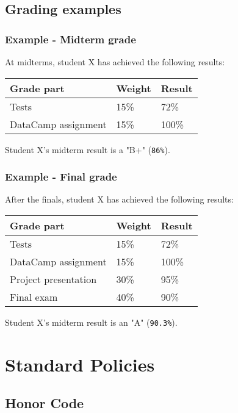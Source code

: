 \documentclass[11pt]{article}
\begin{document}
\subsection{Grading examples}
\label{sec:org67211f3}
\subsubsection{Example - Midterm grade}
\label{sec:org91a2fa4}

At midterms, student X has achieved the following results:

\begin{center}
\begin{tabular}{lll}
\textbf{Grade part} & \textbf{Weight} & \textbf{Result}\\
\hline
Tests & 15\% & 72\%\\
DataCamp assignment & 15\% & 100\%\\
\end{tabular}
\end{center}

Student X's midterm result is a "B+" (\texttt{86\%}).

\subsubsection{Example - Final grade}
\label{sec:org5da0e7a}

After the finals, student X has achieved the following results:

\begin{center}
\begin{tabular}{lll}
\textbf{Grade part} & \textbf{Weight} & \textbf{Result}\\
\hline
Tests & 15\% & 72\%\\
DataCamp assignment & 15\% & 100\%\\
Project presentation & 30\% & 95\%\\
Final exam & 40\% & 90\%\\
\end{tabular}
\end{center}

Student X's midterm result is an "A" (\texttt{90.3\%}).

\section{Standard Policies}
\label{sec:orgd224f32}
\subsection{Honor Code}
\label{sec:org4c3bd91}
\end{document}
